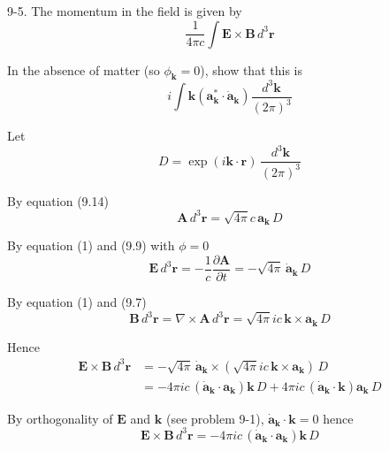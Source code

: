 \documentclass[12pt]{article}
\begin{document}
9-5.
The momentum in the field is given by
\begin{equation*}
\frac{1}{4\pi c}\int
\mathbf E\times\mathbf B\,d^3\mathbf r
\end{equation*}

In the absence of matter (so $\phi_{\mathbf k}=0$),
show that this is
\begin{equation*}
i\int\mathbf k\left(\mathbf a_{\mathbf k}^*\cdot\dot{\mathbf a}_{\mathbf k}\right)
\frac{d^3\mathbf k}{(2\pi)^3}
\end{equation*}

Let
\begin{equation*}
D=\exp(i\mathbf k\cdot\mathbf r)\,\frac{d^3\mathbf k}{(2\pi)^3}
\end{equation*}

By equation (9.14)
\begin{equation*}
\mathbf A\,d^3\mathbf r=\sqrt{4\pi}c\,\mathbf a_{\mathbf k}\,D
\tag{1}
\end{equation*}

By equation (1) and (9.9) with $\phi=0$
\begin{equation*}
\mathbf E\,d^3\mathbf r=-\frac{1}{c}\frac{\partial\mathbf A}{\partial t}
=-\sqrt{4\pi}\,\dot{\mathbf a}_{\mathbf k}\,D
\end{equation*}

By equation (1) and (9.7)
\begin{equation*}
\mathbf B\,d^3\mathbf r=\nabla\times\mathbf A\,d^3\mathbf r
=\sqrt{4\pi}ic\,\mathbf k\times\mathbf a_{\mathbf k}\,D
\end{equation*}

Hence
\begin{align*}
\mathbf E\times\mathbf B\,d^3\mathbf r
&=-\sqrt{4\pi}\,\dot{\mathbf a}_{\mathbf k}
\times\left(\sqrt{4\pi}ic\,\mathbf k\times\mathbf a_{\mathbf k}\right)\,D
\\
&=-4\pi ic\,(\dot{\mathbf a}_{\mathbf k}\cdot\mathbf a_{\mathbf k})\mathbf k\,D
+4\pi ic\,(\dot{\mathbf a}_{\mathbf k}\cdot\mathbf k)\mathbf a_{\mathbf k}\,D
\end{align*}

By orthogonality of $\mathbf E$ and $\mathbf k$ (see problem 9-1),
$\dot{\mathbf a}_{\mathbf k}\cdot\mathbf k=0$ hence
\begin{equation*}
\mathbf E\times\mathbf B\,d^3\mathbf r
=-4\pi ic\,(\dot{\mathbf a}_{\mathbf k}\cdot\mathbf a_{\mathbf k})\mathbf k\,D
\end{equation*}
\end{document}
